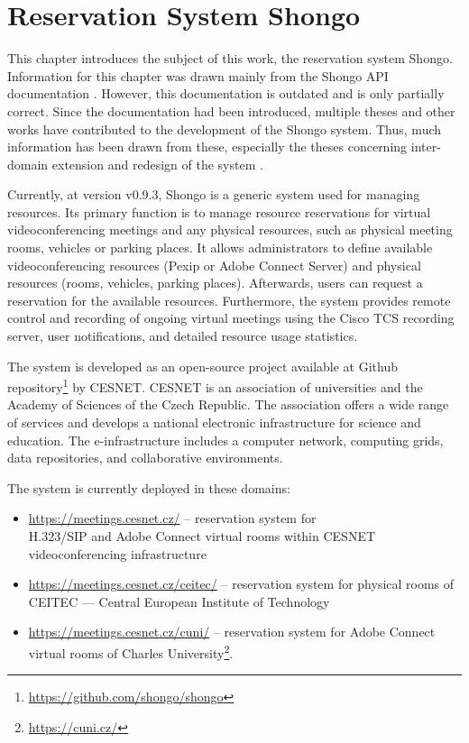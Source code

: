 \chapter{Reservation System Shongo}
This chapter introduces the subject of this work, the reservation system Shongo.
Information for this chapter was drawn mainly from the Shongo API documentation  \cite{shongoapi}. However, this documentation is outdated and is only partially correct. Since the documentation had been introduced, multiple theses and other works have contributed to the development of the Shongo system. Thus, much information has been drawn from these, especially the theses concerning inter-domain extension \cite{pavelka2016shongo} and redesign of the system \cite{perichta2020}.

Currently, at version v0.9.3, Shongo is a generic system used for managing resources.
Its primary function is to manage resource reservations for virtual videoconferencing meetings and any physical resources, such as physical meeting rooms, vehicles or parking places.
It allows administrators to define available videoconferencing resources (Pexip or Adobe Connect Server) and physical resources (rooms, vehicles, parking places). Afterwards, users can request a reservation for the available resources.
Furthermore, the system provides remote control and recording of ongoing virtual meetings using the Cisco TCS recording server, user notifications, and detailed resource usage statistics.
\cite{shongo}

The system is developed as an open-source project available at Github repository\footnote{\url{https://github.com/shongo/shongo}} by CESNET.
CESNET is an association of universities and the Academy of Sciences of the Czech Republic. The association offers a wide range of services and develops a national electronic infrastructure for science and education. The e-infrastructure includes a computer network, computing grids, data repositories, and collaborative environments. \cite{cesnet}

The system is currently deployed in these domains:
\begin{itemize}
    \item \url{https://meetings.cesnet.cz/} -- reservation system for \\
    H.323/SIP and Adobe Connect virtual rooms within CESNET videoconferencing infrastructure
    \item \url{https://meetings.cesnet.cz/ceitec/} -- reservation system for physical rooms of CEITEC --- Central European Institute of Technology
    \item \url{https://meetings.cesnet.cz/cuni/} -- reservation system for Adobe Connect virtual rooms of Charles University\footnote{\url{https://cuni.cz/}}.
\end{itemize}

